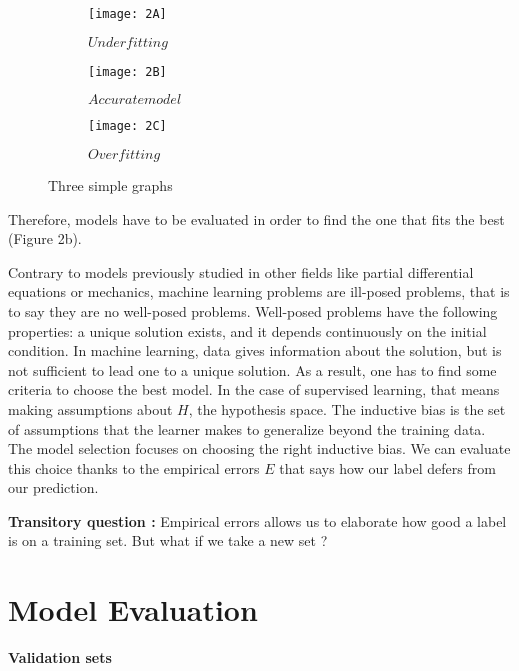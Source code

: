 \documentclass[a4paper,12pt]{article}
\begin{document}
\begin{figure}[!h]
    \centering
    \begin{subfigure}[b]{0.3\textwidth}
        \centering
        \texttt{[image: 2A]}
        \caption{$Underfitting$}
    \end{subfigure}
    \begin{subfigure}[b]{0.3\textwidth}
        \centering
        \texttt{[image: 2B]}
        \caption{$Accurate model$}
    \end{subfigure}
    \begin{subfigure}[b]{0.3\textwidth}
        \centering
        \texttt{[image: 2C]}
        \caption{$Overfitting$}
    \end{subfigure}
    \caption{Three simple graphs}
    \label{fig:three graphs}
\end{figure}

Therefore, models have to be evaluated in order to find the one that fits the best (Figure 2b). 

Contrary to models previously studied in other fields like partial differential equations or mechanics, machine learning problems are ill-posed problems, that is to say they are no well-posed problems. Well-posed problems have the following properties: a unique solution exists, and it depends continuously on the initial condition. In machine learning, data gives information about the solution, but is not sufficient to lead one to a unique solution.
As a result, one has to find some criteria to choose the best model. In the case of supervised learning, that means making assumptions about $H$, the hypothesis space. The inductive bias is the set of assumptions that the learner makes to generalize beyond the training data. The model selection focuses on choosing the right inductive bias. We can evaluate this choice thanks to the empirical errors $E$ that says how our label defers from our prediction.

\textbf{Transitory question :} Empirical errors allows us to elaborate how good a label is on a training set. But what if we take a new set ? 

\newpage
\section{Model Evaluation}

\textbf{Validation sets }
\end{document}
